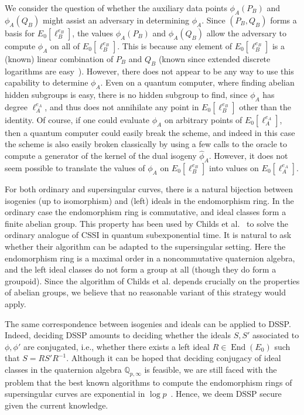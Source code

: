 \documentclass[jmc]{degruyter-journal-a}
\theoremstyle{definition}
\newcommand{\QQ}{{\mathbb{Q}}}
\newcommand{\End}{\operatorname{End}}
\begin{document}
We consider the question of whether the auxiliary data points
$\phi_A(P_B)$ and $\phi_A(Q_B)$ might assist an adversary in
determining $\phi_A$. Since $(P_B,Q_B)$ forms a basis for
$E_0[\ell_B^{e_B}]$, the values $\phi_A(P_B)$ and $\phi_A(Q_B)$ allow
the adversary to compute $\phi_A$ on all of $E_0[\ell_B^{e_B}]$. This
is because any element of $E_0[\ell_B^{e_B}]$ is a (known) linear
combination of $P_B$ and $Q_B$ (known since extended discrete
logarithms are easy~\cite{teske-ph}). However, there does not appear
to be any way to use this capability to determine $\phi_A$. Even on a
quantum computer, where finding abelian hidden subgroups is easy,
there is no hidden subgroup to find, since $\phi_A$ has degree
$\ell_A^{e_A}$, and thus does not annihilate any point in
$E_0[\ell_B^{e_B}]$ other than the identity. Of course, if one could
evaluate $\phi_A$ on arbitrary points of $E_0[\ell_A^{e_A}]$, then a
quantum computer could easily break the scheme, and indeed in this case the
scheme is also easily broken classically by using a few calls to the
oracle to compute a generator of the kernel of the dual isogeny 
$\hat{\phi}_A$. However, it does not seem possible to translate the values of
$\phi_A$ on $E_0[\ell_B^{e_B}]$ into values on $E_0[\ell_A^{e_A}]$.

For both ordinary and supersingular curves, there is a natural
bijection between isogenies (up to isomorphism) and (left) ideals in
the endomorphism ring. In the ordinary case the endomorphism ring is
commutative, and ideal classes form a finite abelian group. This
property has been used by Childs et al.~\cite{CJS} to solve the
ordinary analogue of CSSI in quantum subexponential time. It is
natural to ask whether their algorithm can be adapted to the
supersingular setting. Here the
endomorphism ring is a maximal order in a noncommutative quaternion
algebra, and the left ideal classes do not form a group at all (though
they do
form a groupoid). Since the algorithm of Childs et al. depends
crucially on the properties of abelian groups, we believe that no
reasonable variant of this strategy would apply.

The same correspondence between isogenies and ideals can be applied to
DSSP. Indeed, deciding DSSP amounts to deciding whether the ideals
$S,S'$ associated to $\phi,\phi'$ are conjugated, i.e., whether there
exists a left ideal $R\in\End(E_0)$ such that $S=RS'R^{-1}$. Although
it can be hoped that deciding conjugacy of ideal classes in the
quaternion algebra $\QQ_{p,\infty}$ is feasible, we are still faced
with the problem that the best known algorithms to compute the
endomorphism rings of supersingular curves are exponential in $\log
p$~\cite{Kohel,cervino04,belding08-thesis}. Hence, we deem DSSP secure
given the current knowledge.
\end{document}
